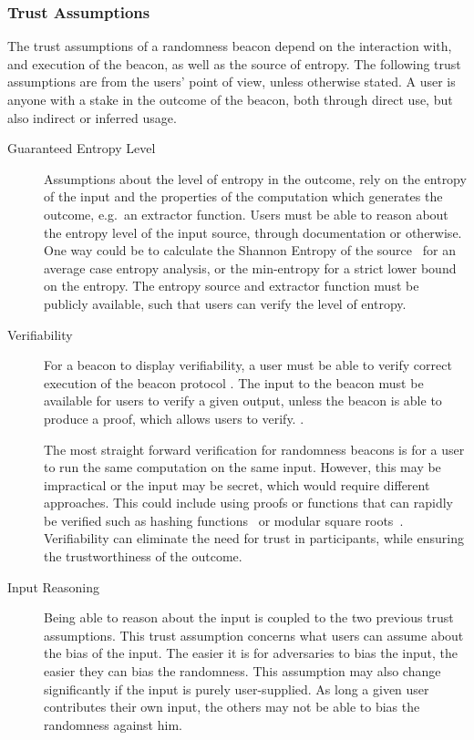 \subsubsection{Trust Assumptions}\label{ssub:trust_assumptions}
The trust assumptions of a randomness beacon depend on the interaction with, and execution of the beacon, as well as the source of entropy.
The following trust assumptions are from the users' point of view, unless otherwise stated.
A user is anyone with a stake in the outcome of the beacon, both through direct use, but also indirect or inferred usage.
\begin{description}

    \item[Guaranteed Entropy Level]
        Assumptions about the level of entropy in the outcome, rely on the entropy of the input and the properties of the computation which generates the outcome, e.g.\ an extractor function.
        Users must be able to reason about the entropy level of the input source, through documentation or otherwise. One way could be to calculate the Shannon Entropy of the source~\cite{informationtheory} for an average case entropy analysis, or the min-entropy for a strict lower bound on the entropy.
        The entropy source and extractor function must be publicly available, such that users can verify the level of entropy.

    \item[Verifiability]
        For a beacon to display verifiability, a user must be able to verify correct execution of the beacon protocol .
        The input to the beacon must be available for users to verify a given output, unless the beacon is able to produce a proof, which allows users to verify. .

        The most straight forward verification for randomness beacons is for a user to run the same computation on the same input.
However, this may be impractical or the input may be secret, which would require different approaches.
This could include using proofs or functions that can rapidly be verified such as hashing functions~\cite{nakamoto2008bitcoin} or modular square roots~\cite{lenstra2015random}.
        Verifiability can eliminate the need for trust in participants, while ensuring the trustworthiness of the outcome.

    \item[Input Reasoning]
        Being able to reason about the input is coupled to the two previous trust assumptions.
This trust assumption concerns what users can assume about the bias of the input.
        The easier it is for adversaries to bias the input, the easier they can bias the randomness.
        This assumption may also change significantly if the input is purely user-supplied.
As long a given user contributes their own input, the others may not be able to bias the randomness against him.

\end{description}

